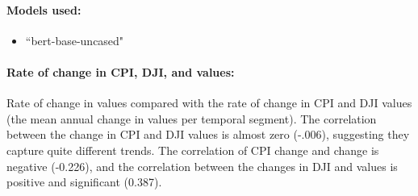 \paragraph{Models used:}
\begin{itemize}
    \item ``bert-base-uncased"
\end{itemize}

\paragraph{Rate of change in CPI, DJI, and \wc values:}
Rate of change in \wc values compared with the rate of change in CPI and DJI values (the mean annual change in values per temporal segment). The correlation between the change in CPI and DJI values is almost zero (-.006), suggesting they capture quite different trends. The correlation of CPI change and \wc change is negative (-0.226), and the correlation between the changes in DJI and \wc values is positive and significant (0.387). 

